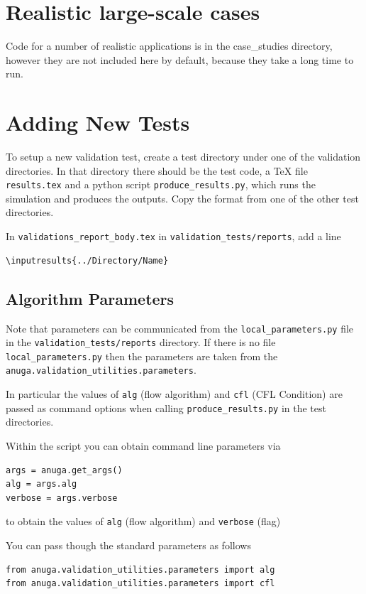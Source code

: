 \chapter{Realistic large-scale cases} \label{ch:casestudy}
Code for a number of realistic applications is in the case\_studies directory,
however they are not included here by default, because they take a long time to
run.

\appendix
\chapter{Adding New Tests}


To setup a new validation test, create a test directory under one of
the validation directories. In that directory there should be the test code, a
\TeX{} file \texttt{results.tex} and a python script
\texttt{produce\_results.py}, which runs the simulation and produces the
outputs. Copy the format from one of the other test directories.

In \texttt{validations\_report\_body.tex} in \texttt{validation\_tests/reports}, add a line
\begin{verbatim}
\inputresults{../Directory/Name}
\end{verbatim}



\section{Algorithm Parameters}
Note that parameters can be communicated from the \verb|local_parameters.py|
file in the \verb|validation_tests/reports| directory. If there is no file
\verb|local_parameters.py| then the parameters are taken from the
\verb|anuga.validation_utilities.parameters|.

In particular the
values of \verb|alg| (flow algorithm) and \verb|cfl| (CFL Condition)
are passed as command options when calling \verb|produce_results.py| in the
test directories.

Within the \anuga{} script you can obtain command line parameters via
\begin{verbatim}
args = anuga.get_args()
alg = args.alg
verbose = args.verbose
\end{verbatim}
to obtain the values of \verb|alg| (flow algorithm) and \verb|verbose| (flag)

You can pass though the standard parameters as follows
\begin{verbatim}
from anuga.validation_utilities.parameters import alg
from anuga.validation_utilities.parameters import cfl
\end{verbatim}

